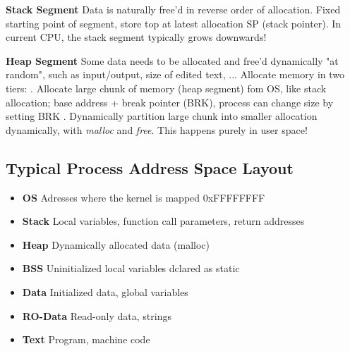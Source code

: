 \documentclass[11pt,a4paper]{article}
\begin{document}
	\textbf{Stack Segment} \newline
	Data is naturally free'd in reverse order of allocation. Fixed starting point of segment, store top at latest allocation SP (stack pointer). In current CPU, the stack segment typically grows downwards!	\newline
	
	\textbf{Heap Segment}
	Some data needs to be allocated and free'd dynamically "at random", such as input/output, size of edited text, ... \newline
	Allocate memory in two tiers: . Allocate large chunk of memory (heap segment) fom OS, like stack allocation; base address + break pointer (BRK), process can change size by setting BRK . Dynamically partition large chunk into smaller allocation dynamically, with \textit{malloc} and \textit{free}. This happens purely in user space!
	
	\subsection{Typical Process Address Space Layout}
	\begin{itemize}
		\item \textbf{OS}				\tab Adresses where the kernel is mapped 0xFFFFFFFF
		\item \textbf{Stack}		 	\tab Local variables, function call parameters, return addresses
		\item \textbf{Heap}				\tab Dynamically allocated data (malloc)
		\item \textbf{BSS}				\tab Uninitialized local variables dclared as static
		\item \textbf{Data}				\tab Initialized data, global variables
		\item \textbf{RO-Data}		\tab Read-only data, strings
		\item \textbf{Text}				\tab Program, machine code
	\end{itemize}
	
	
	
	
	
	\newpage
	
	\printglossaries
	
	
	
\end{document}
